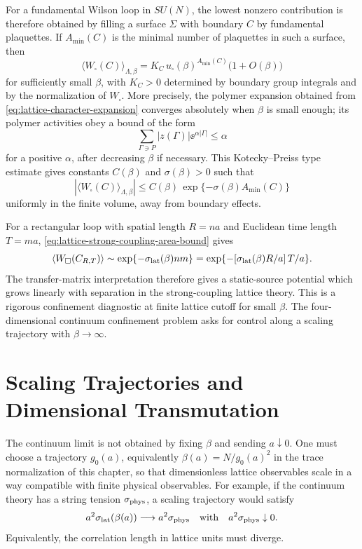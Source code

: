 For a fundamental Wilson loop in \(SU(N)\), the lowest nonzero contribution is
therefore obtained by filling a surface \(\Sigma\) with boundary \(C\) by
fundamental plaquettes.  If \(A_{\min}(C)\) is the minimal number of plaquettes
in such a surface, then
\begin{equation}
  \langle W_{\square}(C)\rangle_{\Lambda,\beta}
  =
  K_C\,
  u_{\square}(\beta)^{A_{\min}(C)}
  \bigl(1+O(\beta)\bigr)
  \label{eq:lattice-strong-coupling-leading-area}
\end{equation}
for sufficiently small \(\beta\), with \(K_C>0\) determined by boundary group
integrals and by the normalization of \(W_{\square}\).  More precisely, the
polymer expansion obtained from \eqref{eq:lattice-character-expansion}
converges absolutely when \(\beta\) is small enough; its polymer activities
obey a bound of the form
\[
  \sum_{\Gamma\ni P}|z(\Gamma)|\ee^{\alpha|\Gamma|}
  \leq \alpha
\]
for a positive \(\alpha\), after decreasing \(\beta\) if necessary.  This
Kotecky--Preiss type estimate gives constants \(C(\beta)\) and
\(\sigma(\beta)>0\) such that
\begin{equation}
  |\langle W_{\square}(C)\rangle_{\Lambda,\beta}|
  \leq
  C(\beta)\,
  \exp\{-\sigma(\beta)A_{\min}(C)\}
  \label{eq:lattice-strong-coupling-area-bound}
\end{equation}
uniformly in the finite volume, away from boundary effects.

For a rectangular loop with spatial length \(R=na\) and Euclidean time length
\(T=ma\), \eqref{eq:lattice-strong-coupling-area-bound} gives
\[
  \langle W_{\square}(C_{R,T})\rangle
  \sim
  \exp\{-\sigma_{\rm lat}(\beta)nm\}
  =
  \exp\{-[\sigma_{\rm lat}(\beta)R/a]\,T/a\}.
  \]
The transfer-matrix interpretation therefore gives a static-source potential
which grows linearly with separation in the strong-coupling lattice theory.
This is a rigorous confinement diagnostic at finite lattice cutoff for small
\(\beta\).  The four-dimensional continuum confinement problem asks for
control along a scaling trajectory with \(\beta\to\infty\).

\section{Scaling Trajectories and Dimensional Transmutation}

The continuum limit is not obtained by fixing \(\beta\) and sending
\(a\downarrow0\).  One must choose a trajectory \(g_0(a)\), equivalently
\(\beta(a)=N/g_0(a)^2\) in the trace normalization of this chapter, so that
dimensionless lattice observables scale in
a way compatible with finite physical observables.  For example, if the
continuum theory has a string tension \(\sigma_{\rm phys}\), a scaling
trajectory would satisfy
\[
  a^2\sigma_{\rm lat}(\beta(a))
  \longrightarrow
  a^2\sigma_{\rm phys}
  \quad\text{with}\quad
  a^2\sigma_{\rm phys}\downarrow0.
\]
Equivalently, the correlation length in lattice units must diverge.

